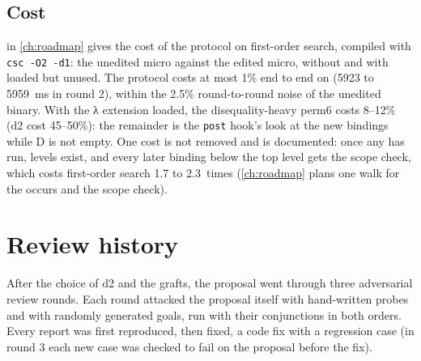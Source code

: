 \subsection{Cost}\label{sec:design-cost}

 in \cref{ch:roadmap} gives the cost of the protocol on first-order
search, compiled with \texttt{csc -O2 -d1}: the unedited micro against the edited micro, without and
with  loaded but unused.
The protocol costs at most 1\% end to end on  (5923 to 5959~ms in round 2), within the
2.5\% round-to-round noise of the unedited binary. With the λ extension loaded, the disequality-heavy
perm6 costs 8--12\% (d2 cost 45--50\%): the remainder is the \texttt{post} hook's look at the new
bindings while D is not empty. One cost is not removed and is documented: once any  has run,
levels exist, and every later binding below the top level gets the scope check, which costs first-order
search 1.7 to 2.3~times (\cref{ch:roadmap} plans one walk for the occurs and the scope check).

\section{Review history}\label{sec:design-reviews}

After the choice of d2 and the grafts, the proposal went through three adversarial review rounds. Each
round attacked the proposal itself with hand-written probes and with randomly generated goals, run
with their conjunctions in both orders. Every report was first reproduced, then fixed, a code fix
with a regression case (in round 3 each new case was checked to fail on the proposal before the fix).

